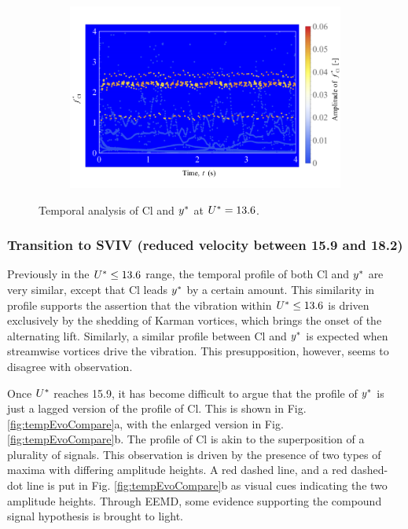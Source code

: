 \documentclass[oneside]{utmthesis}
\begin{document}
\begin{figure} \continuedfloat
  \centering
  \begin{subfigure}[h]{1\textwidth}
    \includegraphics[width=\textwidth]{figs/tempAnalysisLower-c}
    \caption{}
    \label{fig:tempAnalysisLower-c}
  \end{subfigure}
  \caption{Temporal analysis of Cl and $y^{*}$ at $U^{*} = 13.6$.} \label{fig:tempAnalysisLower}
\end{figure}

\subsubsection{Transition to SVIV (reduced velocity between 15.9 and 18.2)} \label{sssec:transSVIV}
Previously in the $U^{*} \leq 13.6$ range, the temporal profile of both Cl and  $y^{*}$ are very similar, except that Cl leads $y^{*}$ by a certain amount. This similarity in profile supports the assertion that the vibration within $U^{*} \leq 13.6$ is driven exclusively by the shedding of Karman vortices, which brings the onset of the alternating lift. Similarly, a similar profile between Cl and $y^{*}$ is expected when streamwise vortices drive the vibration. This presupposition, however, seems to disagree with observation.

Once $U^{*}$ reaches 15.9, it has become difficult to argue that the profile of $y^{*}$ is just a lagged version of the profile of Cl. This is shown in Fig. \ref{fig:tempEvoCompare}a, with the enlarged version in Fig. \ref{fig:tempEvoCompare}b. The profile of Cl is akin to the superposition of a plurality of signals. This observation is driven by the presence of two types of maxima with differing amplitude heights. A red dashed line, and a red dashed-dot line is put in Fig. \ref{fig:tempEvoCompare}b as visual cues indicating the two amplitude heights. Through EEMD, some evidence supporting the compound signal hypothesis is brought to light.
\end{document}
